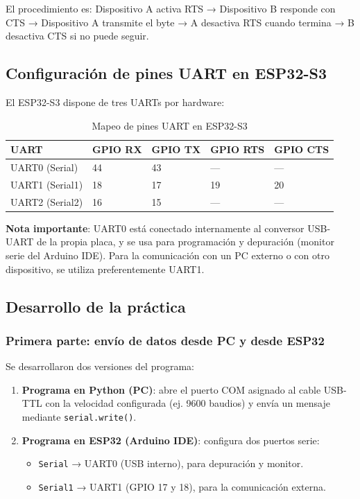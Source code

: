 El procedimiento es: Dispositivo A activa RTS → Dispositivo B responde con CTS → Dispositivo A transmite el byte → A desactiva RTS cuando termina → B desactiva CTS si no puede seguir.


\subsection{Configuración de pines UART en ESP32-S3}

El ESP32-S3 dispone de tres UARTs por hardware:

\begin{table}[htbp]
\centering
\small
\caption{Mapeo de pines UART en ESP32-S3}
\begin{tabular}{@{}lllll@{}}
\toprule
\textbf{UART} & \textbf{GPIO RX} & \textbf{GPIO TX} & \textbf{GPIO RTS} & \textbf{GPIO CTS} \\
\midrule
UART0 (Serial) & 44 & 43 & --- & --- \\
UART1 (Serial1) & 18 & 17 & 19 & 20 \\
UART2 (Serial2) & 16 & 15 & --- & --- \\
\bottomrule
\end{tabular}
\end{table}

\textbf{Nota importante}: UART0 está conectado internamente al conversor USB-UART de la propia placa, y se usa para programación y depuración (monitor serie del Arduino IDE). Para la comunicación con un PC externo o con otro dispositivo, se utiliza preferentemente UART1.

\subsection{Desarrollo de la práctica}

\subsubsection{Primera parte: envío de datos desde PC y desde ESP32}

Se desarrollaron dos versiones del programa:
\begin{enumerate}
    \item \textbf{Programa en Python (PC)}: abre el puerto COM asignado al cable USB-TTL con la velocidad configurada (ej. 9600 baudios) y envía un mensaje mediante \texttt{serial.write()}.
    \item \textbf{Programa en ESP32 (Arduino IDE)}: configura dos puertos serie:
    \begin{itemize}
        \item \texttt{Serial} → UART0 (USB interno), para depuración y monitor.
        \item \texttt{Serial1} → UART1 (GPIO 17 y 18), para la comunicación externa.
    \end{itemize}
\end{enumerate}

